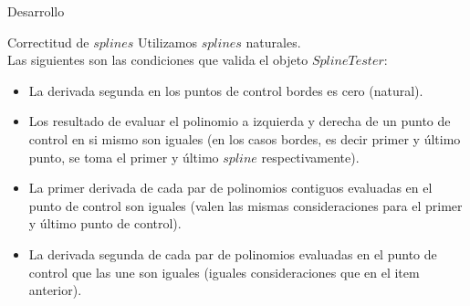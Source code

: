 \begin{section}{Desarrollo}
\begin{subsection}{Correctitud de $splines$}
		Utilizamos $splines$ naturales.\\
		
		Las siguientes son las condiciones que valida el objeto $SplineTester$:
		
		\begin{itemize}
			\item La derivada segunda en los puntos de control bordes es cero (natural).
			\item Los resultado de evaluar el polinomio a izquierda y derecha de un punto de control en si mismo son iguales (en los casos bordes, es decir primer y último punto, se toma el primer y último $spline$ respectivamente).
			\item La primer derivada de cada par de polinomios contiguos evaluadas en el punto de control son iguales (valen las mismas consideraciones para el primer y último punto de control).
			\item La derivada segunda de cada par de polinomios evaluadas en el punto de control que las une son iguales (iguales consideraciones que en el item anterior).
		\end{itemize}
		
	
	\end{subsection}
\end{section}
